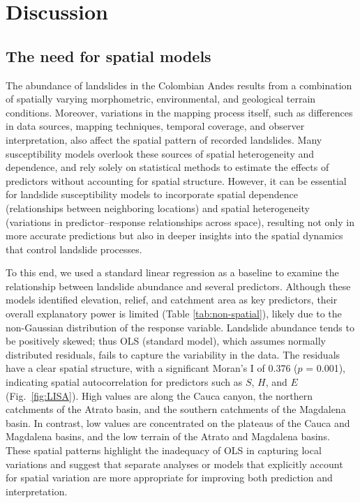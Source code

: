 \documentclass[lineno,pdflatex,sn-basic]{sn-jnl}%
\theoremstyle{thmstyleone}%
\theoremstyle{thmstyletwo}%
\theoremstyle{thmstylethree}%
\begin{document}
\section{Discussion}

\subsection{The need for spatial models}

The abundance of landslides in the Colombian Andes results from a combination of spatially varying morphometric, environmental, and geological terrain conditions. 
Moreover, variations in the mapping process itself, such as differences in data sources, mapping techniques, temporal coverage, and observer interpretation, also affect the spatial pattern of recorded landslides.
Many susceptibility models overlook these sources of spatial heterogeneity and dependence, and rely solely on statistical methods to estimate the effects of predictors without accounting for spatial structure. 
However, it can be essential for landslide susceptibility models to incorporate spatial dependence (relationships between neighboring locations) and spatial heterogeneity (variations in predictor–response relationships across space), resulting not only in more accurate predictions but also in deeper insights into the spatial dynamics that control landslide processes.

To this end, we used a standard linear regression as a baseline to examine the relationship between landslide abundance and several predictors.
Although these models identified elevation, relief, and catchment area as key predictors, their overall explanatory power is limited (Table \ref{tab:non-spatial}), likely due to the non-Gaussian distribution of the response variable. 
Landslide abundance tends to be positively skewed; thus OLS (standard model), which assumes normally distributed residuals, fails to capture the variability in the data.
The residuals have a clear spatial structure, with a significant Moran’s I of 0.376 ($p$ = 0.001), indicating spatial autocorrelation for predictors such as $S$, $H$, and $E$ (Fig.~\ref{fig:LISA}). 
High values are along the Cauca canyon, the northern catchments of the Atrato basin, and the southern catchments of the Magdalena basin. 
In contrast, low values are concentrated on the plateaus of the Cauca and Magdalena basins, and the low terrain of the Atrato and Magdalena basins. 
These spatial patterns highlight the inadequacy of OLS in capturing local variations and suggest that separate analyses or models that explicitly account for spatial variation are more appropriate for improving both prediction and interpretation.
\end{document}
